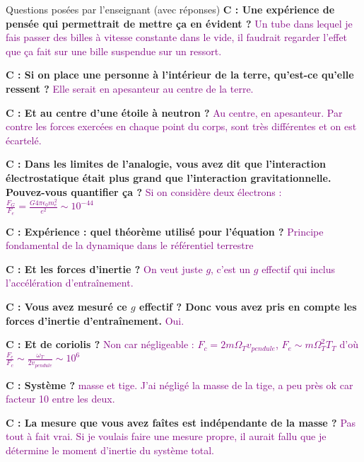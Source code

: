 \begin{reportBlock}{Questions posées par l’enseignant (avec réponses)}
  \textbf{C : Une expérience de pensée qui permettrait de mettre ça en évident ?}  \textcolor{purple}{Un tube dans lequel je fais passer des billes à vitesse constante dans le vide, il faudrait regarder l'effet que ça fait sur une bille suspendue sur un ressort.}\newline
    
  \textbf{C : Si on place une personne à l'intérieur de la terre, qu'est-ce qu'elle ressent ?}  \textcolor{purple}{Elle serait en apesanteur au centre de la terre.}\newline
    
  \textbf{C : Et au centre d'une étoile à neutron ?}  \textcolor{purple}{Au centre, en apesanteur. Par contre les forces exercées en chaque point du corps, sont très différentes et on est écartelé.}\newline
  
  \textbf{C : Dans les limites de l'analogie, vous avez dit que l'interaction électrostatique était plus grand que l'interaction gravitationnelle. Pouvez-vous quantifier ça ?}  \textcolor{purple}{Si on considère deux électrons : $\frac{F_G}{F_e} = \frac{G 4 \pi \epsilon_0 m_e^2}{e^2} \sim 10^{-44}$} \newline

  \textbf{C : Expérience : quel théorème utilisé pour l'équation ?}  \textcolor{purple}{Principe fondamental de la dynamique dans le référentiel terrestre}\newline

  \textbf{C : Et les forces d'inertie ?}  \textcolor{purple}{On veut juste $g$, c'est un $g$ effectif qui inclus l'accélération d'entraînement.}\newline

  \textbf{C : Vous avez mesuré ce $g$ effectif ? Donc vous avez pris en compte les forces d'inertie d'entraînement.}  \textcolor{purple}{Oui.}\newline

  \textbf{C : Et de coriolis ?}  \textcolor{purple}{Non car négligeable : $F_c = 2 m \Omega_T v_{pendule}$, $F_e \sim m \Omega_T^2 T_T$ d'où $\frac{F_e}{F_c} \sim \frac{\omega_T}{2 v_{pendule}} \sim 10^6 $}\newline

  \textbf{C : Système ?}  \textcolor{purple}{masse et tige. J'ai négligé la masse de la tige, a peu près ok car facteur 10 entre les deux.}\newline

  \textbf{C : La mesure que vous avez faîtes est indépendante de la masse ?}  \textcolor{purple}{Pas tout à fait vrai. Si je voulais faire une mesure propre, il aurait fallu que je détermine le moment d'inertie du système total.}\newline


\end{reportBlock}
